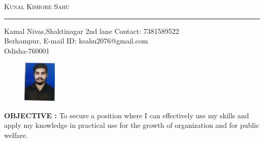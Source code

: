\documentclass[a4]{article}
\begin{document}
\setlength{\parindent}{0em}

\centerline{
\textsc{\LARGE Kunal Kishore Sahu}
}

\vspace{5mm}
\hrule
\vspace{2mm}

Kamal Nivas,Shaktinagar 2nd lane \hspace{7.4cm} Contact: 7381589522\\
Berhampur, \hspace{9cm} E-mail ID: ksahu2076@gmail.com\\
Odisha-760001

\begin{figure}[h!]
\hspace{10.5cm}
\includegraphics[height=2cm]{resume_pic}
\end{figure}

\vspace{3mm}
\textbf{OBJECTIVE : }
To secure a position where I can effectively use my skills and apply my knowledge in practical use for the growth of organization and for public welfare.
\end{document}
